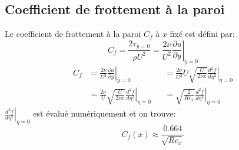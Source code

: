 \documentclass[french]{article}
\begin{document}
\subsection{Coefficient de frottement à la paroi}
Le coefficient de frottement à la paroi $C_{f}$ à $x$ fixé est défini par:
\begin{equation}
	C_{f} =
	\frac{2\tau_{y=0}}{\rho U^{2}} =
	\frac{2\nu}{U^{2}}
	\left.
	\frac{\partial u}{\partial y}
	\right|_{y = 0}
\end{equation}
\begin{align*}
	C_{f} &= 
	\frac{2\nu}{U^{2}}
	\left.
	\frac{\partial u}{\partial y}
	\right|_{y = 0}
	&&= \frac{2\nu}{U^{2}}
	 U\sqrt{\frac{U}{2\nu x}}
	\left.
	\frac{d^{2}f}{d\eta^{2}}
	\right|_{\eta = 0}\\
	&= \frac{2\nu}{U}
	 \sqrt{\frac{U}{2\nu x}}
	\left.
	\frac{d^{2}f}{d\eta^{2}}
	\right|_{\eta = 0}
	&&= 
	 \sqrt{\frac{2}{Re_{x}}}
	\left.
	\frac{d^{2}f}{d\eta^{2}}
	\right|_{\eta = 0}
\end{align*}
$ \left. \frac{d^{2}f}{d\eta^{2}} \right|_{\eta = 0} $ est évalué numériquement et on trouve:
\begin{equation}
	C_{f}(x) \approx \frac{0.664}{\sqrt{Re_{x}}}
\end{equation}
\end{document}
